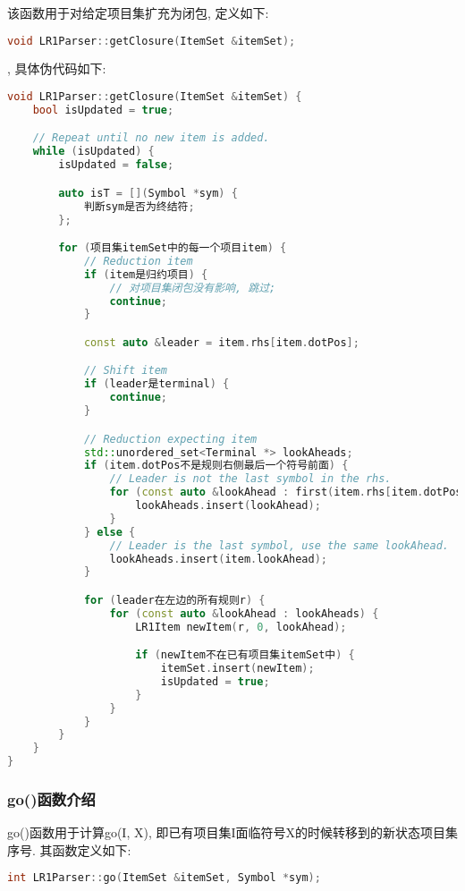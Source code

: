 该函数用于对给定项目集扩充为闭包, 定义如下:
\begin{lstlisting}[language=c++]
void LR1Parser::getClosure(ItemSet &itemSet);
\end{lstlisting}
, 具体伪代码如下:
\begin{lstlisting}[language=c++]
void LR1Parser::getClosure(ItemSet &itemSet) {
    bool isUpdated = true;

    // Repeat until no new item is added.
    while (isUpdated) {
        isUpdated = false;

        auto isT = [](Symbol *sym) {
            判断sym是否为终结符;
        };

        for (项目集itemSet中的每一个项目item) {
            // Reduction item
            if (item是归约项目) {
                // 对项目集闭包没有影响, 跳过;
                continue;
            }

            const auto &leader = item.rhs[item.dotPos];

            // Shift item
            if (leader是terminal) {
                continue;
            }

            // Reduction expecting item
            std::unordered_set<Terminal *> lookAheads;
            if (item.dotPos不是规则右侧最后一个符号前面) {
                // Leader is not the last symbol in the rhs.
                for (const auto &lookAhead : first(item.rhs[item.dotPos + 1])) {
                    lookAheads.insert(lookAhead);
                }
            } else {
                // Leader is the last symbol, use the same lookAhead.
                lookAheads.insert(item.lookAhead);
            }

            for (leader在左边的所有规则r) {
                for (const auto &lookAhead : lookAheads) {
                    LR1Item newItem(r, 0, lookAhead);

                    if (newItem不在已有项目集itemSet中) {
                        itemSet.insert(newItem);
                        isUpdated = true;
                    }
                }
            }
        }
    }
}
\end{lstlisting}

\subsubsection{go()函数介绍}
go()函数用于计算go(I, X), 即已有项目集I面临符号X的时候转移到的新状态项目集序号.
其函数定义如下:
\begin{lstlisting}[language=c++]
int LR1Parser::go(ItemSet &itemSet, Symbol *sym);
\end{lstlisting}

